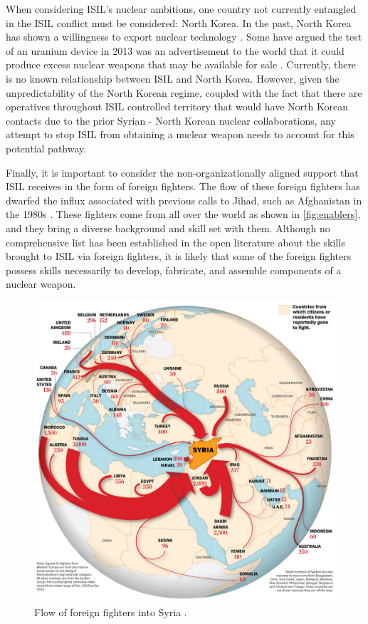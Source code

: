 \documentclass{report}
\begin{document}
When considering ISIL's nuclear ambitions, one country not currently entangled in the ISIL conflict must be considered: North Korea.  In the past, North Korea has shown a willingness to export nuclear technology \cite{Wit2013}.  Some have argued the test of an uranium device in 2013 was an advertisement to the world that it could produce excess nuclear weapons that may be available for sale \cite{Allison2013}.  Currently, there is no known relationship between ISIL and North Korea.  However, given the unpredictability of the North Korean regime, coupled with the fact that there are operatives throughout ISIL controlled territory that would have North Korean contacts due to the prior Syrian - North Korean nuclear collaborations, any attempt to stop ISIL from obtaining a nuclear weapon needs to account for this potential pathway.   


Finally, it is important to consider the non-organizationally aligned support that ISIL receives in the form of foreign fighters.  The flow of these foreign fighters has dwarfed the influx associated with previous calls to Jihad, such as Afghanistan in the 1980s \cite{Barrett2014}.  These fighters come from all over the world as shown in \autoref{fig:enablers}, and they bring a diverse background and skill set with them.  Although no comprehensive list has been established in the open literature about the skills brought to ISIL via foreign fighters, it is likely that some of the foreign fighters possess skills necessarily to develop, fabricate, and assemble components of a nuclear weapon. 

\begin{figure}[h]
 \centering
 \includegraphics[scale=0.6]{./figures/enablers.jpg}
   \caption{Flow of foreign fighters into Syria \cite{Thorp2014}. }
     \label{fig:enablers}
\end{figure}
\end{document}
